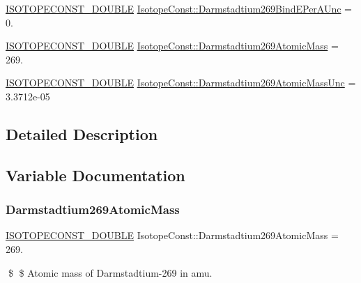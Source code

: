 \begin{DoxyCompactItemize}
\item 
\mbox{\hyperlink{group___isotope_const-_macros_ga8f45a7272ce02c0b4c65c44636ed719a}{I\+S\+O\+T\+O\+P\+E\+C\+O\+N\+S\+T\+\_\+\+D\+O\+U\+B\+LE}} \mbox{\hyperlink{group___isotope_const-_darmstadtium-_ds269_ga6dcb72d4e5d6ca49694118ecc63933a9}{Isotope\+Const\+::\+Darmstadtium269\+Bind\+E\+Per\+A\+Unc}} = 0.
\item 
\mbox{\hyperlink{group___isotope_const-_macros_ga8f45a7272ce02c0b4c65c44636ed719a}{I\+S\+O\+T\+O\+P\+E\+C\+O\+N\+S\+T\+\_\+\+D\+O\+U\+B\+LE}} \mbox{\hyperlink{group___isotope_const-_darmstadtium-_ds269_gac1359b0f66b8e2f57ab861d578890f5e}{Isotope\+Const\+::\+Darmstadtium269\+Atomic\+Mass}} = 269.
\item 
\mbox{\hyperlink{group___isotope_const-_macros_ga8f45a7272ce02c0b4c65c44636ed719a}{I\+S\+O\+T\+O\+P\+E\+C\+O\+N\+S\+T\+\_\+\+D\+O\+U\+B\+LE}} \mbox{\hyperlink{group___isotope_const-_darmstadtium-_ds269_ga68f98b66c332cc5a0e49fa05cab67043}{Isotope\+Const\+::\+Darmstadtium269\+Atomic\+Mass\+Unc}} = 3.\+3712e-\/05
\end{DoxyCompactItemize}


\subsection{Detailed Description}


\subsection{Variable Documentation}
\mbox{\label{group___isotope_const-_darmstadtium-_ds269_gac1359b0f66b8e2f57ab861d578890f5e}} 
\subsubsection{\texorpdfstring{Darmstadtium269\+Atomic\+Mass}{Darmstadtium269AtomicMass}}
{\footnotesize\ttfamily \mbox{\hyperlink{group___isotope_const-_macros_ga8f45a7272ce02c0b4c65c44636ed719a}{I\+S\+O\+T\+O\+P\+E\+C\+O\+N\+S\+T\+\_\+\+D\+O\+U\+B\+LE}} Isotope\+Const\+::\+Darmstadtium269\+Atomic\+Mass = 269.}

\$ \$ Atomic mass of Darmstadtium-\/269 in amu. \mbox{\label{group___isotope_const-_darmstadtium-_ds269_ga68f98b66c332cc5a0e49fa05cab67043}} 
